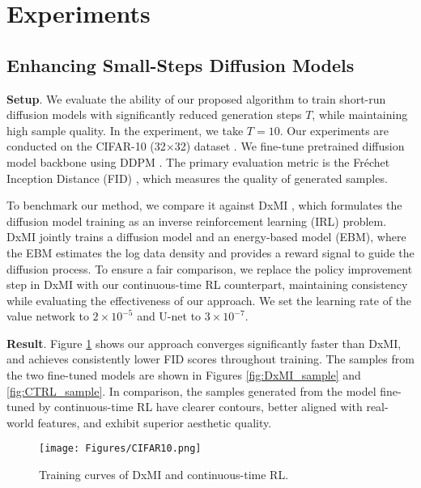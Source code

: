 \documentclass{article}
\theoremstyle{plain}
\theoremstyle{definition}
\theoremstyle{remark}
\newcommand{\blue}[1]{\textcolor{blue}{#1}}
\begin{document}
\section{Experiments}
\label{sc5}


\subsection{Enhancing Small-Steps Diffusion Models}
\textbf{Setup}. We evaluate the ability of our proposed algorithm to train short-run diffusion models with significantly reduced generation steps $T$,
while maintaining high sample quality. 
In the experiment, we take $T=10$. Our experiments are conducted on the CIFAR-10 (32×32) dataset \cite{cifar10}. We fine-tune pretrained diffusion model backbone using DDPM \cite{Ho20DDPM}. The primary evaluation metric is the Fréchet Inception Distance (FID) \cite{fid}, which measures the quality of generated samples.

To benchmark our method, we compare it against DxMI \cite{dxmi}, which formulates the diffusion model training as an inverse reinforcement learning (IRL) problem. DxMI jointly trains a diffusion model and an energy-based model (EBM), where the EBM estimates the log data density and provides a reward signal to guide the diffusion process. To ensure a fair comparison, we replace the policy improvement step in DxMI with our continuous-time RL counterpart, maintaining consistency while evaluating the effectiveness of our approach. We set the learning rate of the value network to $2\times10^{-5}$ and U-net to $3\times 10^{-7}$.

\textbf{Result}. Figure \ref{fig:cifar10} shows our approach converges significantly faster than DxMI, and achieves consistently lower FID scores throughout training. The samples from the two fine-tuned models are shown in Figures \ref{fig:DxMI_sample} and \ref{fig:CTRL_sample}. In comparison, the samples generated from the model fine-tuned by continuous-time RL have clearer contours, better aligned with real-world features, and exhibit superior aesthetic quality.

\begin{figure}[htbp]
    \centering
    \texttt{[image: Figures/CIFAR10.png]}
    \caption{Training curves of DxMI and continuous-time RL.}
    \label{fig:cifar10}
\end{figure}
\end{document}
